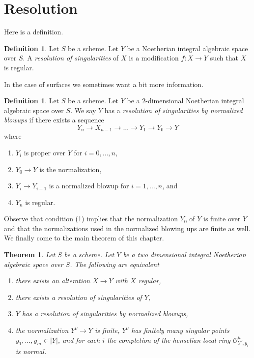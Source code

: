 \documentclass{stacks-project}
\theoremstyle{plain}
\newtheorem{theorem}[subsection]{Theorem}
\theoremstyle{definition}
\newtheorem{definition}[subsection]{Definition}
\theoremstyle{remark}
\numberwithin{equation}{subsection}
\begin{document}
\section{Resolution}
\label{section-resolution}

\noindent
Here is a definition.

\begin{definition}
\label{definition-resolution}
Let $S$ be a scheme. Let $Y$ be a Noetherian integral algebraic space over
$S$. A {\it resolution of singularities} of $X$ is a modification
$f : X \to Y$ such that $X$ is regular.
\end{definition}

\noindent
In the case of surfaces we sometimes want a bit more information.

\begin{definition}
\label{definition-resolution-surface}
Let $S$ be a scheme. Let $Y$ be a $2$-dimensional Noetherian integral
algebraic space over $S$. We say $Y$ has a
{\it resolution of singularities by normalized blowups}
if there exists a sequence
$$
Y_n \to X_{n - 1} \to \ldots \to Y_1 \to Y_0 \to Y
$$
where
\begin{enumerate}
\item $Y_i$ is proper over $Y$ for $i = 0, \ldots, n$,
\item $Y_0 \to Y$ is the normalization,
\item $Y_i \to Y_{i - 1}$ is a normalized blowup for $i = 1, \ldots, n$, and
\item $Y_n$ is regular.
\end{enumerate}
\end{definition}

\noindent
Observe that condition (1) implies that the normalization
$Y_0$ of $Y$ is finite over $Y$ and that the normalizations
used in the normalized blowing ups are finite as well.
We finally come to the main theorem of this chapter.

\begin{theorem}
\label{theorem-resolve}
Let $S$ be a scheme. Let $Y$ be a two dimensional integral
Noetherian algebraic space over $S$. The following are equivalent
\begin{enumerate}
\item there exists an alteration $X \to Y$ with $X$ regular,
\item there exists a resolution of singularities of $Y$,
\item $Y$ has a resolution of singularities by normalized blowups,
\item the normalization $Y^\nu \to Y$ is finite, $Y^\nu$ has
finitely many singular points $y_1, \ldots, y_m \in |Y|$, and
for each $i$ the completion of the henselian local ring
$\mathcal{O}_{Y^\nu, y_i}^h$ is normal.
\end{enumerate}
\end{theorem}
\end{document}
